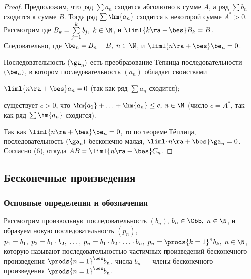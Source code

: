 \documentclass[a4paper]{article}
\begin{document}
\begin{proof}
Предположим, что ряд $\sum a_n$ сходится абсолютно к сумме $A$, а
ряд $\sum b_n$ сходится к сумме $B$. Тогда ряд $\sum\hm{a_n}$
сходится к некоторой сумме $A^*>0$. Рассмотрим  где
$B_k=\sum\limits_{j=1}^k b_j, \; k\in\N$, и $\liml{k\ra+\bes}
B_k=B$. Следовательно,  где $\be_n=B_n-B, \; n\in\N$, и
$\liml{n\ra+\bes}\be_n=0$.

Последовательность $(\ga_n)$ есть преобразование Тёплица
последовательности $(\be_n)$, в котором последовательность $(a_n)$
обладает свойствами \begin{nums}{-2}
\item $\liml{n\ra+\bes}a_n=0$ (так как ряд $\sum a_n$ сходится);
\item существует $c>0$, что $\hm{a_1}+\ldots + \hm{a_n}\le c, \;
n\in\N$ (число $c=A^*$, так как ряд $\sum\hm{a_n}$ сходится).
\end{nums}
Так как $\liml{n\ra+\bes}\be_n=0$, то по теореме Тёплица,
последовательность $(\ga_n)$ бесконечно малая,
$\liml{n\ra+\bes}\ga_n=0$. Согласно (6),
 откуда $AB=\liml{n\ra+\bes}C_n$.
\end{proof}

\subsection{Бесконечные произведения}
\subsubsection{Основные определения и обозначения}

Рассмотрим произвольную последовательность $(b_n)$, $b_n\in\Cbb, \;
n\in\N$, и образуем новую последовательность $(p_n)$, $p_1=b_1,\;
p_2=b_1\cdot b_2,\;\ldots,\;p_n=b_1\cdot b_2\cdot\ldots\cdot b_n, \;
p_n=\prods{k=1}^n b_k, \; n\in\N$, которую называют
последовательностью частичных произведений бесконечного произведения
$\prods{n=1}^{\bes} b_n$, числа $b_n$ --- члены бесконечного
произведения $\prods{n=1}^{\bes}b_n$.
\end{document}
